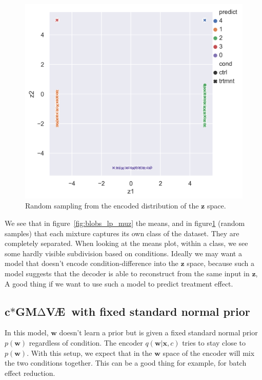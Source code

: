 \documentclass[11pt, a4paper]{report}
\theoremstyle{plain}
\theoremstyle{definition}
\theoremstyle{remark}
\newcommand{\x}{\mathbf{x}}
\newcommand{\z}{\mathbf{z}}
\newcommand{\w}{\mathbf{w}}
\newcommand{\gmvae}{c$\ast$GM$\mathrm{\Delta}$V\AE~}
\begin{document}
\begin{figure}[h]
\centering
\includegraphics[width=1.1\textwidth]{images/blobs_cgmvae_learnedprior_z.png}
\caption{Random sampling from the encoded distribution of the $\z$ space. 
}
\label{fig:blobs_lp_z}
\end{figure}

We see that in figure~\ref{fig:blobs_lp_muz} the means, and in
figure\ref{fig:blobs_lp_z} (random samples) that each mixture captures its own
class of the dataset. They are completely separated. When looking at the means
plot, within a class, we
see some hardly visible subdivision based on conditions.
Ideally we may want a model that doesn't encode condition-difference into the
$\z$ space, because such a model 
suggests that the decoder is able to reconstruct from the same input in $\z$,
A good thing if we want to use such a
model to predict treatment effect.

\subsection{\gmvae with fixed standard normal prior}

In this model, $\w$ doesn't learn a prior but is given a fixed standard normal
prior $p(\w)$ regardless of condition.
The encoder $q(\w | \x, c)$ 
tries to stay close to $p(\w)$.
With this setup, we expect that in the $\w$ space of the 
encoder will mix the two conditions together. This can be a good thing for
example, for batch effect reduction.
\end{document}
